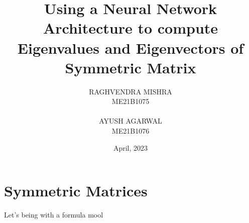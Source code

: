 \documentclass[12pt]{article}
\title{Using a Neural Network Architecture to compute Eigenvalues and Eigenvectors of Symmetric Matrix}
\author{RAGHVENDRA MISHRA\\
        \small ME21B1075\\ \\ 
        AYUSH AGARWAL \\
        \small ME21B1076}
\date{April, 2023}
\begin{document}
\maketitle

\section{Symmetric Matrices}
Let's being with a formula mool
\end{document}
